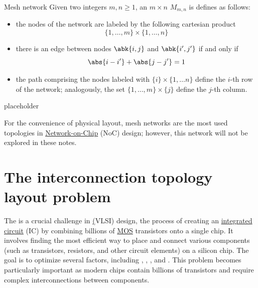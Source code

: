 \documentclass[a4paper, 12pt]{report}
\begin{document}
    \begin{frameddefn}{Mesh network}
        Given two integers $m, n \ge 1$, an $m \times n$  $M_{m, n}$ is defines as follows:

        \begin{itemize}
            \item the nodes of the network are labeled by the following cartesian product $$\{1, \ldots, m\} \times \{1, \ldots, n\}$$
            \item there is an edge between nodes $\abk{i,j}$ and $\abk{i',j'}$ if and only if $$\abs{i - i'} + \abs{j - j'} = 1$$
            \item the path comprising the nodes labeled with $\{i\} \times \{1, \ldots n\}$ define the $i$-th row of the network; analogously, the set $\{1, \ldots, m\} \times \{j\}$ define the $j$-th column.
        \end{itemize}
    \end{frameddefn}

    \begin{example}
        placeholder 
    \end{example}

    For the convenience of physical layout, mesh networks are the most used topologies in \href{https://en.wikipedia.org/wiki/Network_on_a_chip}{Network-on-Chip} (NoC) design; however, this network will not be explored in these notes.

    \chapter{The interconnection topology layout problem}
    
    The  is a crucial challenge in \href{very-large-scale integration} (VLSI) design, the process of creating an \href{https://en.wikipedia.org/wiki/Integrated_circuit}{integrated circuit} (IC) by combining billions of \href{https://en.wikipedia.org/wiki/MOSFET}{MOS} transistors onto a single chip. It involves finding the most efficient way to place and connect various components (such as transistors, resistors, and other circuit elements) on a silicon chip. The goal is to optimize several factors, including , , , and . This problem becomes particularly important as modern chips contain billions of transistors and require complex interconnections between components.
\end{document}
